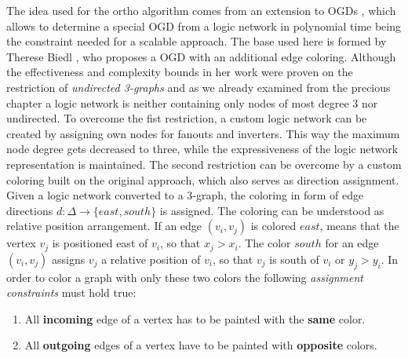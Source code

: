 The idea used for the ortho algorithm comes from an extension to OGDs , which allows to determine a special OGD from a logic network in polynomial time being the constraint needed for a scalable approach. The base used here is formed by Therese Biedl \cite{biedl1998better}, who proposes a OGD with an additional edge coloring. Although the effectiveness and complexity bounds in her work were proven on the restriction of \textit{undirected 3-graphs} and as we already examined from the precious chapter a logic network is neither containing only nodes of most degree 3 nor undirected. To overcome the fist restriction, a custom logic network can be created by assigning own nodes for fanouts and inverters. This way the maximum node degree gets decreased to three, while the expressiveness of the logic network representation is maintained. The second restriction can be overcome by a custom coloring built on the original approach, which also serves as direction assignment. Given a logic network converted to a 3-graph, the coloring in form of edge directions $d : \Delta \rightarrow \{east, south\}$ is assigned. The coloring can be understood as relative position arrangement. If an edge $(v_i, v_j)$ is colored $east$, means that the vertex $v_j$ is positioned east of $v_i$, so that $x_j > x_i$. The color $south$ for an edge $(v_i, v_j)$ assigns $v_j$ a relative position of $v_i$, so that $v_j$ is south of $v_i$ or $y_j > y_i$. In order to color a graph with only these two colors the following \textit{assignment constraints} must hold true:
\begin{enumerate}
	\item All \textbf{incoming} edge of a vertex has to be painted with the \textbf{same} color.
	\item All \textbf{outgoing} edges of a vertex have to be painted with \textbf{opposite} colors.
\end{enumerate}

